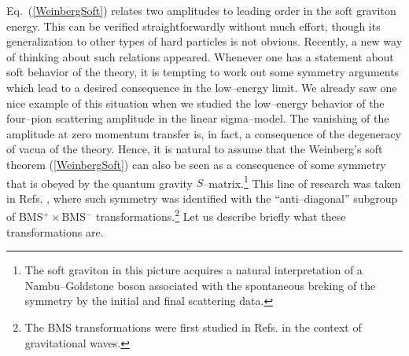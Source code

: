 \documentclass[11pt,a4paper]{article}
\begin{document}
Eq.~(\ref{WeinbergSoft}) relates two amplitudes to leading order in the soft graviton energy. This can be verified straightforwardly without much effort, though its generalization to other types of hard particles is not obvious.
Recently, a new way of thinking about such relations appeared.
Whenever one has a statement about soft behavior of the theory, it is tempting to work out some symmetry arguments which lead to a desired consequence in the low--energy limit.
We already saw one nice example of this situation when we studied the low--energy behavior of the four--pion scattering amplitude in the linear sigma--model. The vanishing of the amplitude at zero momentum transfer is, in fact, a consequence of the degeneracy of vacua of the theory. Hence, it is natural to assume that the Weinberg's soft theorem (\ref{WeinbergSoft}) can also be seen as a consequence of some symmetry that is obeyed by the quantum gravity $S$--matrix.\footnote{The soft graviton in this picture acquires a natural interpretation of a Nambu--Goldstone boson associated with the spontaneous breking of the symmetry by the initial and final scattering data.} This line of research was taken in Refs. \cite{Strominger:2013jfa,He:2014laa}, where such symmetry was identified with the ``anti--diagonal'' subgroup of BMS$^+\times$BMS$^-$ transformations.\footnote{The BMS transformations were first studied in Refs. \cite{Bondi:1962px,Sachs:1962wk} in the context of gravitational waves.} Let us describe briefly what these transformations are.
\end{document}
